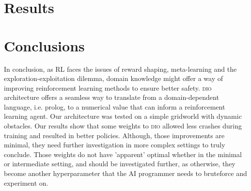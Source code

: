 \documentclass[acmsmall]{acmart}
\theoremstyle{definition}
\newcommand{\dio}{\textsc{dio}}
\begin{document}







\section{Results}

 

\section{Conclusions}

In conclusion, as RL faces the issues of reward shaping, meta-learning and the exploration-exploitation dilemma, domain knowledge might offer a way of improving reinforcement learning methods to ensure better 
safety. \dio{} architecture offers a seamless way to translate from a domain-dependent language, i.e. prolog, to a numerical value that can inform a reinforcement learning agent. 
Our architecture was tested on a simple gridworld with dynamic obstacles. 
Our results show that some weights to \dio{} allowed less crashes during training and resulted in better policies. Although, those improvements are minimal, 
they need further investigation in more complex settings to truly conclude. Those weights do not have 'apparent' optimal whether in the minimal or intermediate setting, and should be investigated further, as otherwise, they become 
another hyperparameter that the AI programmer needs to bruteforce and experiment on. 

\newpage






\end{document}
